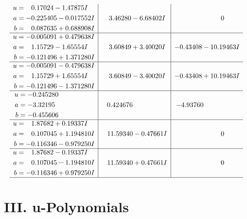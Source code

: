 \documentclass[1p]{elsarticle_modified}
\theoremstyle{definition}
\begin{document}
$$\begin{array}{c|c|c}
\begin{aligned}
u &= \phantom{-}0.17024 - 1.47875 I \\
a &= -0.225405 - 0.017552 I \\
b &= \phantom{-}0.087635 + 0.688908 I\end{aligned}
 & \phantom{-}3.46280 - 6.68402 I & \phantom{-0.000000 } 0 \\ \hline\begin{aligned}
u &= -0.005091 + 0.479638 I \\
a &= \phantom{-}1.15729 - 1.65554 I \\
b &= -0.121496 + 1.371280 I\end{aligned}
 & \phantom{-}3.60849 + 3.40020 I & -0.43408 - 10.19463 I \\ \hline\begin{aligned}
u &= -0.005091 - 0.479638 I \\
a &= \phantom{-}1.15729 + 1.65554 I \\
b &= -0.121496 - 1.371280 I\end{aligned}
 & \phantom{-}3.60849 - 3.40020 I & -0.43408 + 10.19463 I \\ \hline\begin{aligned}
u &= -0.245280\phantom{ +0.000000I} \\
a &= -3.32195\phantom{ +0.000000I} \\
b &= -0.455606\phantom{ +0.000000I}\end{aligned}
 & \phantom{-}0.424676\phantom{ +0.000000I} & -4.93760\phantom{ +0.000000I} \\ \hline\begin{aligned}
u &= \phantom{-}1.87682 + 0.19337 I \\
a &= \phantom{-}0.107045 + 1.194810 I \\
b &= -0.116346 - 0.979250 I\end{aligned}
 & \phantom{-}11.59340 - 0.47661 I & \phantom{-0.000000 } 0 \\ \hline\begin{aligned}
u &= \phantom{-}1.87682 - 0.19337 I \\
a &= \phantom{-}0.107045 - 1.194810 I \\
b &= -0.116346 + 0.979250 I\end{aligned}
 & \phantom{-}11.59340 + 0.47661 I & \phantom{-0.000000 } 0\\
 \hline 
 \end{array}$$\newpage
\newpage\renewcommand{\arraystretch}{1}
\centering \section*{ III. u-Polynomials}
\end{document}
